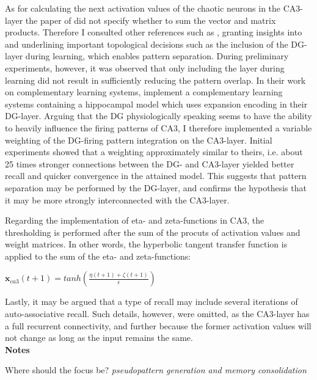 As for calculating the next activation values of the chaotic neurons in the CA3-layer the paper of \cite{Hattori2014} did not specify whether to sum the vector and matrix products. Therefore I consulted other references such as \citep{Wakagi2008}, granting insights into and underlining important topological decisions such as the inclusion of the DG-layer during learning, which enables pattern separation. During preliminary experiments, however, it was observed that only including the layer during learning did not result in sufficiently reducing the pattern overlap.
In their work on complementary learning systems, \cite{Norman2003} implement a complementary learning systems containing a hippocampal model which uses expansion encoding in their DG-layer. Arguing that the DG physiologically speaking seems to have the ability to heavily influence the firing patterns of CA3, I therefore implemented a variable weighting of the DG-firing pattern integration on the CA3-layer. Initial experiments showed that a weighting approximately similar to theirs, i.e. about 25 times stronger connections between the DG- and CA3-layer yielded better recall and quicker convergence in the attained model. This suggests that pattern separation may be performed by the DG-layer, and confirms the hypothesis that it may be more strongly interconnected with the CA3-layer.

Regarding the implementation of eta- and zeta-functions in CA3, the thresholding is performed after the sum of the procuts of activation values and weight matrices. In other words, the hyperbolic tangent transfer function is applied to the sum of the eta- and zeta-functions: 

\begin{center}
\begin{math}
    \textbf{x}_{ca3}(t+1) = tanh(\frac{\eta(t+1) + \zeta(t+1)}{\epsilon})
\end{math}
\end{center}

Lastly, it may be argued that a type of recall may include several iterations of auto-associative recall. Such details, however, were omitted, as the CA3-layer has a full recurrent connectivity, and further because the former activation values will not change as long as the input remains the same.
\\

\textbf{Notes}

Where should the focus be? \textit{pseudopattern generation and memory consolidation}

